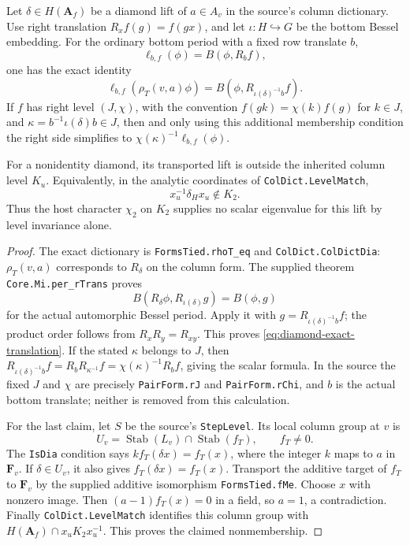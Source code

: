 \begin{proposition}
\label{prop:diamond-period-translation}
Let $\delta\in H(\mathbf A_f)$ be a diamond lift of $a\in A_v$
in the source's column dictionary.  Use right translation
$R_x f(g)=f(gx)$, and let $\iota:H\hookrightarrow G$ be the bottom
Bessel embedding.  For the ordinary bottom period with a fixed
row translate $b$,
\[
 \ell_{b,f}(\phi)=B(\phi,R_bf),
\]
one has the exact identity
\begin{equation}
 \ell_{b,f}(\rho_T(v,a)\phi)
   =B(\phi,R_{\iota(\delta)^{-1}b}f).
 \label{eq:diamond-exact-translation}
\end{equation}
If $f$ has right level $(J,\chi)$, with the convention
$f(gk)=\chi(k)f(g)$ for $k\in J$, and
$\kappa=b^{-1}\iota(\delta)b\in J$, then and only using this
additional membership condition the right side simplifies to
$\chi(\kappa)^{-1}\ell_{b,f}(\phi)$.

For a nonidentity diamond, its transported lift is outside the
inherited column level $K_u$.  Equivalently, in the analytic
coordinates of \texttt{ColDict.LevelMatch},
\[
 x_u^{-1}\delta_Hx_u\notin K_2.
\]
Thus the host character $\chi_2$ on $K_2$ supplies no scalar
eigenvalue for this lift by level invariance alone.
\end{proposition}
\begin{proof}
The exact dictionary is
\texttt{FormsTied.rhoT\_eq} and \texttt{ColDict.ColDictDia}:
$\rho_T(v,a)$ corresponds to $R_\delta$ on the column form.
The supplied theorem \texttt{Core.Mi.per\_rTrans} proves
\[
 B(R_\delta\phi,R_{\iota(\delta)}g)=B(\phi,g)
\]
for the actual automorphic Bessel period.  Apply it with
$g=R_{\iota(\delta)^{-1}b}f$; the product order follows from
$R_xR_y=R_{xy}$.  This proves
\eqref{eq:diamond-exact-translation}.  If the stated $\kappa$
belongs to $J$, then
$R_{\iota(\delta)^{-1}b}f=R_bR_{\kappa^{-1}}f
=\chi(\kappa)^{-1}R_bf$, giving the scalar formula.  In the
source the fixed $J$ and $\chi$ are precisely \texttt{PairForm.rJ}
and \texttt{PairForm.rChi}, and $b$ is the actual bottom translate;
neither is removed from this calculation.

For the last claim, let $S$ be the source's \texttt{StepLevel}.
Its local column group at $v$ is
\[
 U_v=\operatorname{Stab}(L_v)\cap\operatorname{Stab}(f_T),
 \qquad f_T\ne0.
\]
The \texttt{IsDia} condition says
$k f_T(\delta x)=f_T(x)$, where the integer $k$ maps to $a$ in
$\mathbf F_v$.  If $\delta\in U_v$, it also gives
$f_T(\delta x)=f_T(x)$.  Transport the additive target of $f_T$
to $\mathbf F_v$ by the supplied additive isomorphism
\texttt{FormsTied.fMe}.  Choose $x$ with nonzero image.
Then $(a-1)f_T(x)=0$ in a field, so $a=1$, a contradiction.
Finally \texttt{ColDict.LevelMatch} identifies this column group
with $H(\mathbf A_f)\cap x_uK_2x_u^{-1}$.  This proves the claimed
nonmembership.
\end{proof}


